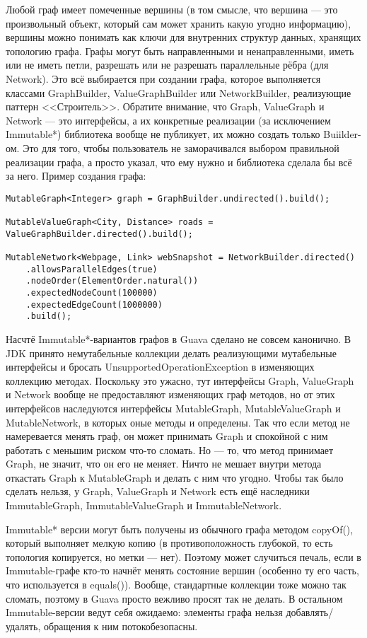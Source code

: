 \documentclass[a5paper,draft]{article}
\begin{document}
Любой граф имеет помеченные вершины (в том смысле, что вершина --- это произвольный объект, который сам может хранить какую угодно информацию), вершины можно понимать как ключи для внутренних структур данных, хранящих топологию графа. Графы могут быть направленными и ненаправленными, иметь или не иметь петли, разрешать или не разрешать параллельные рёбра (для Network). Это всё выбирается при создании графа, которое выполняется классами GraphBuilder, ValueGraphBuilder или NetworkBuilder, реализующие паттерн <<Строитель>>. Обратите внимание, что Graph, ValueGraph и Network --- это интерфейсы, а их конкретные реализации (за исключением Immutable*) библиотека вообще не публикует, их можно создать только Buiilder-ом. Это для того, чтобы пользователь не заморачивался выбором правильной реализации графа, а просто указал, что ему нужно и библиотека сделала бы всё за него. Пример создания графа:

\begin{verbatim}
MutableGraph<Integer> graph = GraphBuilder.undirected().build();

MutableValueGraph<City, Distance> roads = ValueGraphBuilder.directed().build();

MutableNetwork<Webpage, Link> webSnapshot = NetworkBuilder.directed()
    .allowsParallelEdges(true)
    .nodeOrder(ElementOrder.natural())
    .expectedNodeCount(100000)
    .expectedEdgeCount(1000000)
    .build();
\end{verbatim}

Насчтё Immutable*-вариантов графов в Guava сделано не совсем канонично. В JDK принято немутабельные коллекции делать реализующими мутабельные интерфейсы и бросать UnsupportedOperationException в изменяющих коллекцию методах. Поскольку это ужасно, тут интерфейсы Graph, ValueGraph и Network вообще не предоставляют изменяющих граф методов, но от этих интерфейсов наследуются интерфейсы MutableGraph, MutableValueGraph и MutableNetwork, в которых оные методы и определены. Так что если метод не намеревается менять граф, он может принимать Graph и спокойной с ним работать с меньшим риском что-то сломать. Но --- то, что метод принимает Graph, не значит, что он его не меняет. Ничто не мешает внутри метода откастать Graph к MutableGraph и делать с ним что угодно. Чтобы так было сделать нельзя, у Graph, ValueGraph и Network есть ещё наследники ImmutableGraph, ImmutableValueGraph и ImmutableNetwork. 

Immutable* версии могут быть получены из обычного графа методом copyOf(), который выполняет мелкую копию (в противоположность глубокой, то есть топология копируется, но метки --- нет). Поэтому может случиться печаль, если в Immutable-графе кто-то начнёт менять состояние вершин (особенно ту его часть, что используется в equals()). Вообще, стандартные коллекции тоже можно так сломать, поэтому в Guava просто вежливо просят так не делать. В остальном Immutable-версии ведут себя ожидаемо: элементы графа нельзя добавлять/удалять, обращения к ним потокобезопасны.
\end{document}
